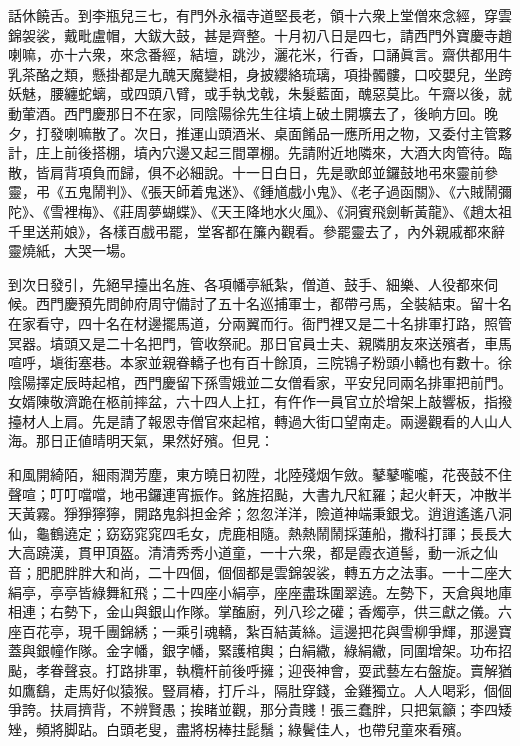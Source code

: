 話休饒舌。到李瓶兒三七，有門外永福寺道堅長老，領十六衆上堂僧來念經，穿雲錦袈裟，戴毗盧帽，大鈸大鼓，甚是齊整。{}十月初八日是四七，請西門外寶慶寺趙喇嘛，亦十六衆，來念番經，結壇，跳沙，灑花米，行香，口誦眞言。齋供都用牛乳茶酪之類，懸掛都是九醜天魔變相，身披纓絡琉璃，項掛髑髏，口咬嬰兒，坐跨妖魅，腰纏蛇螭，或四頭八臂，或手執戈戟，朱髮藍面，醜惡莫比。午齋以後，就動葷酒。西門慶那日不在家，同陰陽徐先生往墳上破土開壙去了，後晌方回。晚夕，打發喇嘛散了。次日，推運山頭酒米、桌面餚品一應所用之物，又委付主管夥計，庄上前後搭棚，墳內穴邊又起三間罩棚。先請附近地隣來，大酒大肉管待。臨散，皆肩背項負而歸，{}俱不必細說。十一日白日，先是歌郎並鑼鼓地弔來靈前參靈，弔《五鬼鬧判》、《張天師着鬼迷》、《鍾馗戲小鬼》、《老子過函關》、《六賊鬧彌陀》、《雪裡梅》、《莊周夢蝴蝶》、《天王降地水火風》、《洞賓飛劍斬黃龍》、《趙太祖千里送荊娘》，各樣百戲弔罷，堂客都在簾內觀看。參罷靈去了，內外親戚都來辭靈燒紙，大哭一場。

到次日發引，先絕早擡出名旌、各項幡亭紙紮，僧道、鼓手、細樂、人役都來伺候。西門慶預先問帥府周守備討了五十名巡捕軍士，都帶弓馬，全裝結束。留十名在家看守，四十名在材邊擺馬道，分兩翼而行。衙門裡又是二十名排軍打路，照管冥器。墳頭又是二十名把門，管收祭祀。那日官員士夫、親隣朋友來送殯者，車馬喧呼，塡街塞巷。本家並親眷轎子也有百十餘頂，三院鴇子粉頭小轎也有數十。徐陰陽擇定辰時起棺，西門慶留下孫雪娥並二女僧看家，平安兒同兩名排軍把前門。女婿陳敬濟跪在柩前摔盆，{}六十四人上扛，有仵作一員官立於增架上敲響板，指撥擡材人上肩。先是請了報恩寺僧官來起棺，轉過大街口望南走。兩邊觀看的人山人海。那日正値晴明天氣，果然好殯。但見：

\begin{myquote}
和風開綺陌，細雨潤芳塵，東方曉日初陞，北陸殘烟乍斂。鼕鼕嚨嚨，花䘮鼓不住聲喧；叮叮噹噹，地弔鑼連宵振作。銘旌招颭，大書九尺紅羅；起火軒天，冲散半天黃霧。猙猙獰獰，開路鬼斜担金斧；忽忽洋洋，險道神端秉銀戈。逍逍遙遙八洞仙，龜鶴遶定；窈窈窕窕四毛女，虎鹿相隨。熱熱鬧鬧採蓮船，撒科打諢；長長大大高蹺漢，貫甲頂盔。清清秀秀小道童，一十六衆，都是霞衣道髻，動一派之仙音；肥肥胖胖大和尚，二十四個，個個都是雲錦袈裟，轉五方之法事。一十二座大絹亭，亭亭皆綠舞紅飛；二十四座小絹亭，座座盡珠圍翠遶。左勢下，天倉與地庫相連；右勢下，金山與銀山作隊。掌醢廚，列八珍之礶；香燭亭，供三獻之儀。六座百花亭，現千團錦綉；一乘引魂轎，紮百結黃絲。這邊把花與雪柳爭輝，那邊寶蓋與銀幢作隊。金字幡，銀字幡，緊護棺輿；白絹繖，綠絹繖，同圍增架。功布招颭，孝眷聲哀。打路排軍，執欖杆前後呼擁；迎䘮神會，耍武藝左右盤旋。賣解猶如鷹鷂，走馬好似猿猴。豎肩樁，打斤斗，隔肚穿錢，金雞獨立。人人喝彩，個個爭誇。扶肩擠背，不辨賢愚；挨睹並觀，那分貴賤！張三蠢胖，只把氣籲；李四矮矬，頻將脚跕。白頭老叟，盡將柺棒拄髭鬚；綠鬢佳人，也帶兒童來看殯。
\end{myquote}


